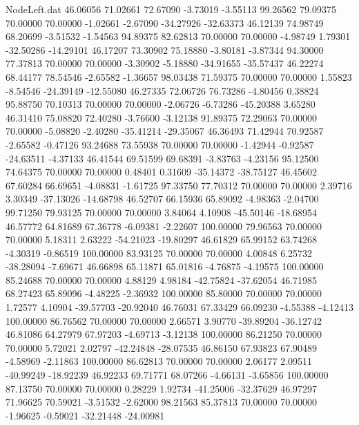 \begin{filecontents}{NodeLeft.dat}
  46.06056   71.02661   72.67090    -3.73019   -3.55113   99.26562   79.09375   70.00000   70.00000   -1.02661   -2.67090  -34.27926  -32.63373
  46.12139   74.98749   68.20699    -3.51532   -1.54563   94.89375   82.62813   70.00000   70.00000   -4.98749    1.79301  -32.50286  -14.29101
  46.17207   73.30902   75.18880    -3.80181   -3.87344   94.30000   77.37813   70.00000   70.00000   -3.30902   -5.18880  -34.91655  -35.57437
  46.22274   68.44177   78.54546    -2.65582   -1.36657   98.03438   71.59375   70.00000   70.00000    1.55823   -8.54546  -24.39149  -12.55080
  46.27335   72.06726   76.73286    -4.80456    0.38824   95.88750   70.10313   70.00000   70.00000   -2.06726   -6.73286  -45.20388    3.65280
  46.31410   75.08820   72.40280    -3.76600   -3.12138   91.89375   72.29063   70.00000   70.00000   -5.08820   -2.40280  -35.41214  -29.35067
  46.36493   71.42944   70.92587    -2.65582   -0.47126   93.24688   73.55938   70.00000   70.00000   -1.42944   -0.92587  -24.63511   -4.37133
  46.41544   69.51599   69.68391    -3.83763   -4.23156   95.12500   74.64375   70.00000   70.00000    0.48401    0.31609  -35.14372  -38.75127
  46.45602   67.60284   66.69651    -4.08831   -1.61725   97.33750   77.70312   70.00000   70.00000    2.39716    3.30349  -37.13026  -14.68798
  46.52707   66.15936   65.89092    -4.98363   -2.04700   99.71250   79.93125   70.00000   70.00000    3.84064    4.10908  -45.50146  -18.68954
  46.57772   64.81689   67.36778    -6.09381   -2.22607  100.00000   79.96563   70.00000   70.00000    5.18311    2.63222  -54.21023  -19.80297
  46.61829   65.99152   63.74268    -4.30319   -0.86519  100.00000   83.93125   70.00000   70.00000    4.00848    6.25732  -38.28094   -7.69671
  46.66898   65.11871   65.01816    -4.76875   -4.19575  100.00000   85.24688   70.00000   70.00000    4.88129    4.98184  -42.75824  -37.62054
  46.71985   68.27423   65.89096    -4.48225   -2.36932  100.00000   85.80000   70.00000   70.00000    1.72577    4.10904  -39.57703  -20.92040
  46.76031   67.33429   66.09230    -4.55388   -4.12413  100.00000   86.76562   70.00000   70.00000    2.66571    3.90770  -39.89204  -36.12742
  46.81086   64.27979   67.97203    -4.69713   -3.12138  100.00000   86.21250   70.00000   70.00000    5.72021    2.02797  -42.24848  -28.07535
  46.86150   67.93823   67.90489    -4.58969   -2.11863  100.00000   86.62813   70.00000   70.00000    2.06177    2.09511  -40.99249  -18.92239
  46.92233   69.71771   68.07266    -4.66131   -3.65856  100.00000   87.13750   70.00000   70.00000    0.28229    1.92734  -41.25006  -32.37629
  46.97297   71.96625   70.59021    -3.51532   -2.62000   98.21563   85.37813   70.00000   70.00000   -1.96625   -0.59021  -32.21448  -24.00981

\end{filecontents}

